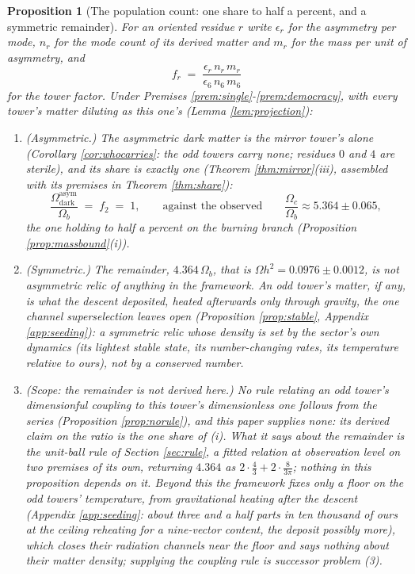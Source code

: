 \documentclass[11pt]{article}
\newtheorem{proposition}[theorem]{Proposition}
\theoremstyle{definition}
\begin{document}
\begin{proposition}[The population count: one share to half a percent, and a symmetric remainder]\label{prop:count}
For an oriented residue $r$ write $\epsilon_{r}$ for the asymmetry per mode, $n_{r}$ for the mode count of its derived matter and $m_{r}$ for the mass per unit of asymmetry, and
\[
f_{r} \;=\; \frac{\epsilon_{r}\,n_{r}\,m_{r}}{\epsilon_{6}\,n_{6}\,m_{6}}
\]
for the tower factor. Under Premises \ref{prem:single}-\ref{prem:democracy}, with every tower's matter diluting as this one's (Lemma \ref{lem:projection}):
\begin{enumerate}
\item[(i)] \emph{(Asymmetric.)} The asymmetric dark matter is the mirror tower's alone (Corollary \ref{cor:whocarries}: the odd towers carry none; residues $0$ and $4$ are sterile), and its share is exactly one (Theorem \ref{thm:mirror}(iii), assembled with its premises in Theorem \ref{thm:share}):
\begin{equation}\label{eq:ratio}
\frac{\Omega^{\mathrm{asym}}_{\mathrm{dark}}}{\Omega_{b}} \;=\; f_{2} \;=\; 1, \qquad\text{against the observed}\qquad \frac{\Omega_{c}}{\Omega_{b}} \approx 5.364 \pm 0.065,
\end{equation}
the one holding to half a percent on the burning branch (Proposition \ref{prop:massbound}(i)).
\item[(ii)] \emph{(Symmetric.)} The remainder, $4.364\,\Omega_{b}$, that is $\Omega h^{2} = 0.0976 \pm 0.0012$, is not asymmetric relic of anything in the framework. An odd tower's matter, if any, is what the descent deposited, heated afterwards only through gravity, the one channel superselection leaves open (Proposition \ref{prop:stable}, Appendix \ref{app:seeding}): a symmetric relic whose density is set by the sector's own dynamics (its lightest stable state, its number-changing rates, its temperature relative to ours), not by a conserved number.
\item[(iii)] \emph{(Scope: the remainder is not derived here.)} No rule relating an odd tower's dimensionful coupling to this tower's dimensionless one follows from the series (Proposition \ref{prop:norule}), and this paper supplies none: its derived claim on the ratio is the one share of (i). What it says about the remainder is the unit-ball rule of Section \ref{sec:rule}, a fitted relation at observation level on two premises of its own, returning $4.364$ as $2 \cdot \tfrac{4}{3} + 2 \cdot \tfrac{8}{3\pi}$; nothing in this proposition depends on it. Beyond this the framework fixes only a floor on the odd towers' temperature, from gravitational heating after the descent (Appendix \ref{app:seeding}: about three and a half parts in ten thousand of ours at the ceiling reheating for a nine-vector content, the deposit possibly more), which closes their radiation channels near the floor and says nothing about their matter density; supplying the coupling rule is successor problem (3).

\end{enumerate}
\end{proposition}
\end{document}
